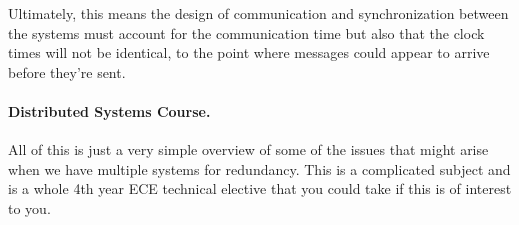 Ultimately, this means the design of communication and synchronization between the systems must account for the communication time but also that the clock times will not be identical, to the point where messages could appear to arrive before they're sent.


\paragraph{Distributed Systems Course.}
All of this is just a very simple overview of some of the issues that might arise when we have multiple systems for redundancy. This is a complicated subject and is a whole 4th year ECE technical elective that you could take if this is of interest to you. 



